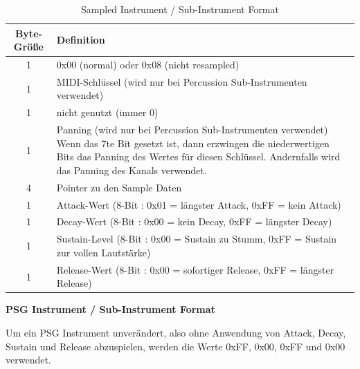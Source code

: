 \documentclass[11pt,a4paper]{scrartcl}
\newcommand{\paratitle}[1] {
    \vspace{5mm}
    \large \textbf{#1} \normalsize
    \vspace{2mm}\newline
}
\begin{document}
\begin{table}[h]
    \centering
    \begin{tabular}{ c | p{15cm} }
        \textbf{Byte-Gr\"o{\ss}e} & \textbf{Definition} \\
        \hline
        1 & 0x00 (normal) oder 0x08 (nicht resampled) \\
        \hline
        1 & MIDI-Schl\"ussel (wird nur bei Percussion Sub-Instrumenten verwendet) \\
        \hline
        1 & nicht genutzt (immer 0) \\
        \hline
        1 & Panning (wird nur bei Percussion Sub-Instrumenten verwendet)\newline
        Wenn das 7te Bit gesetzt ist, dann erzwingen die niederwertigen Bits das Panning des Wertes f\"ur diesen Schl\"ussel. Andernfalls wird das Panning des Kanals verwendet. \\
        \hline
        4 & Pointer zu den Sample Daten \\
        \hline
        1 & Attack-Wert (8-Bit : 0x01 = l\"angster Attack, 0xFF = kein Attack) \\
        \hline
        1 & Decay-Wert (8-Bit : 0x00 = kein Decay, 0xFF = l\"angster Decay) \\
        \hline
        1 & Sustain-Level (8-Bit : 0x00 = Sustain zu Stumm, 0xFF = Sustain zur vollen Lautst\"arke) \\
        \hline
        1 & Release-Wert (8-Bit : 0x00 = sofortiger Release, 0xFF = l\"angster Release) \\
    \end{tabular}
    \caption{Sampled Instrument / Sub-Instrument Format}
    \label{table:SampleInstrument}
\end{table}


\newpage
\paratitle{PSG Instrument / Sub-Instrument Format}
Um ein PSG Instrument unver\"andert, also ohne Anwendung von Attack, Decay, Sustain und Release abzuspielen, werden die Werte 0xFF, 0x00, 0xFF und 0x00 verwendet.
\end{document}
